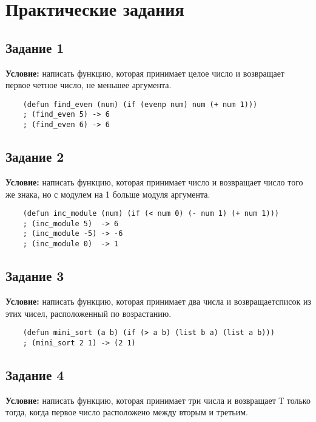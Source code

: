 \chapter{Практические задания}

\section{Задание 1}

\textbf{Условие:} написать функцию, которая принимает целое число и возвращает первое четное число, не меньшее аргумента.

\begin{lstlisting}
	(defun find_even (num) (if (evenp num) num (+ num 1)))
	; (find_even 5) -> 6
	; (find_even 6) -> 6
\end{lstlisting}


\section{Задание 2}

\textbf{Условие:} написать функцию, которая принимает число и возвращает число того же знака, но с модулем на 1 больше модуля аргумента.

\begin{lstlisting}
	(defun inc_module (num) (if (< num 0) (- num 1) (+ num 1)))
	; (inc_module 5)  -> 6
	; (inc_module -5) -> -6
	; (inc_module 0)  -> 1
\end{lstlisting}


\section{Задание 3}

\textbf{Условие:} написать функцию, которая принимает два числа и возвращаетсписок из этих чисел, расположенный по возрастанию.


\begin{lstlisting}
	(defun mini_sort (a b) (if (> a b) (list b a) (list a b)))
	; (mini_sort 2 1) -> (2 1)
\end{lstlisting}


\section{Задание 4}

\textbf{Условие:} написать функцию, которая принимает три числа и возвращает Т только тогда, когда первое число расположено между вторым и третьим.


